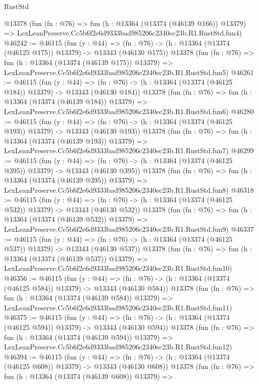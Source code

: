 \begin{lexlean}{RustStd}
\begin{coremodule}
    @13378
    (fun (fn : @76) =>
    fun (h : @13364 (@13374 (@46139 @166)) @13379) =>
    LexLeanPreserve.Cc5b6f2e6d9333bad985206c2340ec23b.R1.RustStd.fun4)
@46242 := @46115
    (fun (y : @44) =>
    (fn : @76) -> (h : @13364 (@13374 (@46125 @175)) @13379) -> @13343 (@46130 @175))
    @13378
    (fun (fn : @76) =>
    fun (h : @13364 (@13374 (@46139 @175)) @13379) =>
    LexLeanPreserve.Cc5b6f2e6d9333bad985206c2340ec23b.R1.RustStd.fun5)
@46261 := @46115
    (fun (y : @44) =>
    (fn : @76) -> (h : @13364 (@13374 (@46125 @184)) @13379) -> @13343 (@46130 @184))
    @13378
    (fun (fn : @76) =>
    fun (h : @13364 (@13374 (@46139 @184)) @13379) =>
    LexLeanPreserve.Cc5b6f2e6d9333bad985206c2340ec23b.R1.RustStd.fun6)
@46280 := @46115
    (fun (y : @44) =>
    (fn : @76) -> (h : @13364 (@13374 (@46125 @193)) @13379) -> @13343 (@46130 @193))
    @13378
    (fun (fn : @76) =>
    fun (h : @13364 (@13374 (@46139 @193)) @13379) =>
    LexLeanPreserve.Cc5b6f2e6d9333bad985206c2340ec23b.R1.RustStd.fun7)
@46299 := @46115
    (fun (y : @44) =>
    (fn : @76) -> (h : @13364 (@13374 (@46125 @395)) @13379) -> @13343 (@46130 @395))
    @13378
    (fun (fn : @76) =>
    fun (h : @13364 (@13374 (@46139 @395)) @13379) =>
    LexLeanPreserve.Cc5b6f2e6d9333bad985206c2340ec23b.R1.RustStd.fun8)
@46318 := @46115
    (fun (y : @44) =>
    (fn : @76) -> (h : @13364 (@13374 (@46125 @532)) @13379) -> @13343 (@46130 @532))
    @13378
    (fun (fn : @76) =>
    fun (h : @13364 (@13374 (@46139 @532)) @13379) =>
    LexLeanPreserve.Cc5b6f2e6d9333bad985206c2340ec23b.R1.RustStd.fun9)
@46337 := @46115
    (fun (y : @44) =>
    (fn : @76) -> (h : @13364 (@13374 (@46125 @537)) @13379) -> @13343 (@46130 @537))
    @13378
    (fun (fn : @76) =>
    fun (h : @13364 (@13374 (@46139 @537)) @13379) =>
    LexLeanPreserve.Cc5b6f2e6d9333bad985206c2340ec23b.R1.RustStd.fun10)
@46356 := @46115
    (fun (y : @44) =>
    (fn : @76) -> (h : @13364 (@13374 (@46125 @584)) @13379) -> @13343 (@46130 @584))
    @13378
    (fun (fn : @76) =>
    fun (h : @13364 (@13374 (@46139 @584)) @13379) =>
    LexLeanPreserve.Cc5b6f2e6d9333bad985206c2340ec23b.R1.RustStd.fun11)
@46375 := @46115
    (fun (y : @44) =>
    (fn : @76) -> (h : @13364 (@13374 (@46125 @594)) @13379) -> @13343 (@46130 @594))
    @13378
    (fun (fn : @76) =>
    fun (h : @13364 (@13374 (@46139 @594)) @13379) =>
    LexLeanPreserve.Cc5b6f2e6d9333bad985206c2340ec23b.R1.RustStd.fun12)
@46394 := @46115
    (fun (y : @44) =>
    (fn : @76) -> (h : @13364 (@13374 (@46125 @608)) @13379) -> @13343 (@46130 @608))
    @13378
    (fun (fn : @76) =>
    fun (h : @13364 (@13374 (@46139 @608)) @13379) =>

\end{coremodule}
\end{lexlean}
